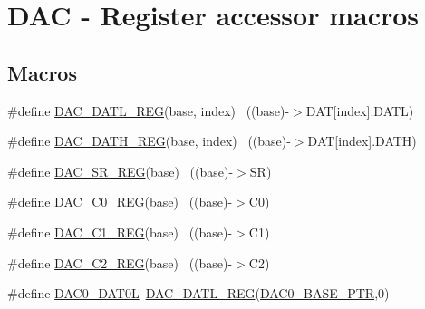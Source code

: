 \hypertarget{group___d_a_c___register___accessor___macros}{}\section{D\+AC -\/ Register accessor macros}
\label{group___d_a_c___register___accessor___macros}
\subsection*{Macros}
\begin{DoxyCompactItemize}
\item 
\#define \hyperlink{group___d_a_c___register___accessor___macros_gabf321758d2caebaf297aed5907b1bb5d}{D\+A\+C\+\_\+\+D\+A\+T\+L\+\_\+\+R\+EG}(base,  index)                              ~((base)-\/$>$D\+AT\mbox{[}index\mbox{]}.D\+A\+TL)
\item 
\#define \hyperlink{group___d_a_c___register___accessor___macros_ga2993d3474a391b72469826f58317edc9}{D\+A\+C\+\_\+\+D\+A\+T\+H\+\_\+\+R\+EG}(base,  index)                              ~((base)-\/$>$D\+AT\mbox{[}index\mbox{]}.D\+A\+TH)
\item 
\#define \hyperlink{group___d_a_c___register___accessor___macros_ga6f61e2c24c3ca2e6207c3a46a95da33a}{D\+A\+C\+\_\+\+S\+R\+\_\+\+R\+EG}(base)                                              ~((base)-\/$>$SR)
\item 
\#define \hyperlink{group___d_a_c___register___accessor___macros_ga2ad6906035a9d1a45b0493f8010b630b}{D\+A\+C\+\_\+\+C0\+\_\+\+R\+EG}(base)                                              ~((base)-\/$>$C0)
\item 
\#define \hyperlink{group___d_a_c___register___accessor___macros_ga4f28424aead9b953486830b6f3c4b3e6}{D\+A\+C\+\_\+\+C1\+\_\+\+R\+EG}(base)                                              ~((base)-\/$>$C1)
\item 
\#define \hyperlink{group___d_a_c___register___accessor___macros_ga5627f7a03cdcede26b3f5a60bc7a3871}{D\+A\+C\+\_\+\+C2\+\_\+\+R\+EG}(base)                                              ~((base)-\/$>$C2)
\item 
\#define \hyperlink{group___d_a_c___register___accessor___macros_ga42102f01d7c10ffe6e888e69befd52cd}{D\+A\+C0\+\_\+\+D\+A\+T0L}~\hyperlink{group___d_a_c___register___accessor___macros_gabf321758d2caebaf297aed5907b1bb5d}{D\+A\+C\+\_\+\+D\+A\+T\+L\+\_\+\+R\+EG}(\hyperlink{group___d_a_c___peripheral_gabe3b30df06ec04e5c899efd6e49f1800}{D\+A\+C0\+\_\+\+B\+A\+S\+E\+\_\+\+P\+TR},0)

\end{DoxyCompactItemize}
